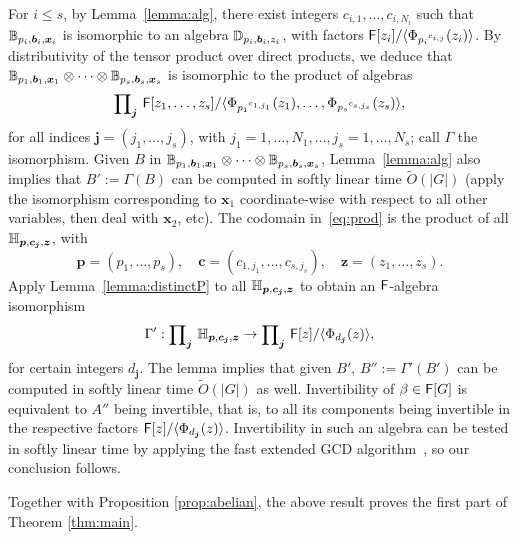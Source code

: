 For $i \le s$, by Lemma~\ref{lemma:alg}, there exist integers
$c_{i,1},\dots,c_{i,N_i}$ such that
$\mathbb{B}_{p_i,\boldsymbol{b}_i,\boldsymbol{x}_i}$ is isomorphic to an
algebra $\mathbb{D}_{p_i, \boldsymbol{b}_i, z_i}$, with factors 
${\mathsf{F}}[z_i]/\langle \Phi_{{p_i}^{c_{i,j}}}(z_i) \rangle$.
By distributivity of the tensor product over direct products, we
deduce that $\mathbb{B}_{p_1,\boldsymbol{b}_1,\boldsymbol{x}_1} \otimes \cdots
\otimes \mathbb{B}_{p_s,\boldsymbol{b}_s,\boldsymbol{x}_s}$ is isomorphic to
the product of algebras
 \begin{equation}\label{eq:prod}
\text{\small $\prod$}_{\boldsymbol{j}}~ {\mathsf{F}}[z_1,\dots,z_s]/
\langle \Phi_{{p_1}^{c_{1,j_1}}}(z_1),\dots, \Phi_{{p_s}^{c_{s,j_s}}}(z_s) \rangle,   
 \end{equation}
for all indices $\boldsymbol{j}=(j_1,\dots,j_s)$, with
$j_1 =1,\dots,N_1,\dots,j_s=1,\dots,N_s$;
call $\Gamma$ the isomorphism. Given $B$ in $\mathbb{B}_{p_1,\boldsymbol{b}_1,\boldsymbol{x}_1} \otimes
\cdots \otimes \mathbb{B}_{p_s,\boldsymbol{b}_s,\boldsymbol{x}_s}$,
Lemma~\ref{lemma:alg} also implies that $B':=\Gamma(B)$ can be
computed in softly linear time $\tilde{O}(|G|)$ (apply the isomorphism
corresponding to $\boldsymbol{x}_1$ coordinate-wise with respect to
all other variables, then deal with $\boldsymbol{x}_2$, etc).
The codomain in~\eqref{eq:prod} is the product of all $\mathbb{H}_{\boldsymbol{p},\boldsymbol{c}_{\boldsymbol{j}},\boldsymbol{z}}$,
with 
$$\boldsymbol{p}=(p_1,\dots,p_s),\quad \boldsymbol{c}=(c_{1,j_1},\dots,c_{s,j_s}),\quad \boldsymbol{z}=(z_1,\dots,z_s).$$
Apply Lemma~\ref{lemma:distinctP} to all 
$\mathbb{H}_{\boldsymbol{p},\boldsymbol{c}_{\boldsymbol{j}},\boldsymbol{z}}$ to obtain
an ${\mathsf{F}}$-algebra isomorphism
$$\Gamma': \text{\small $\prod$}_{\boldsymbol{j}}~
\mathbb{H}_{\boldsymbol{p},\boldsymbol{c}_{\boldsymbol{j}},\boldsymbol{z}} \to
\text{\small $\prod$}_{\boldsymbol{j}} ~{\mathsf{F}}[z]/\langle
\Phi_{d_{\boldsymbol{j}}}(z) \rangle,$$ for certain integers
$d_{\boldsymbol{j}}$. The lemma implies that given $B'$,
$B'':=\Gamma'(B')$ can be computed in softly linear time
$\tilde{O}(|G|)$ as well. Invertibility of $\beta \in {\mathsf{F}}[G]$ is
equivalent to $A''$ being invertible, that is, to all its components
being invertible in the respective factors ${\mathsf{F}}[z]/\langle
\Phi_{d_{\boldsymbol{j}}}(z) \rangle$. Invertibility in such an
algebra can be tested in softly linear time by applying the fast
extended GCD algorithm~\cite[Chapter~11]{vzGathen13}, so our conclusion follows. 

\smallskip

Together with Proposition \ref{prop:abelian}, the above result proves
the first part of Theorem \ref{thm:main}.


